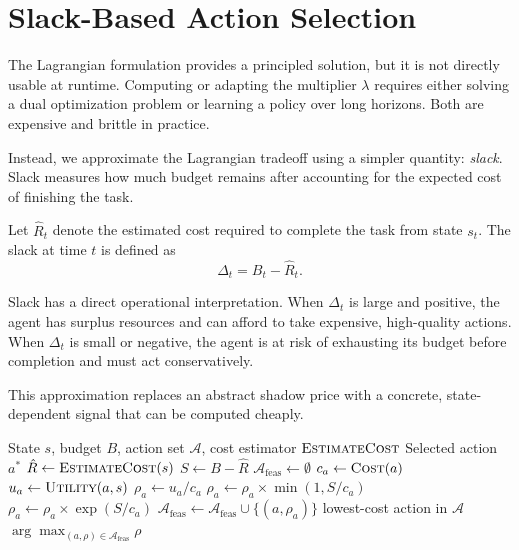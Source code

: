 \section{Slack-Based Action Selection}

The Lagrangian formulation provides a principled solution, but it is not directly usable at runtime. Computing or adapting the multiplier $\lambda$ requires either solving a dual optimization problem or learning a policy over long horizons. Both are expensive and brittle in practice.

Instead, we approximate the Lagrangian tradeoff using a simpler quantity: \emph{slack}. Slack measures how much budget remains after accounting for the expected cost of finishing the task.

Let $\hat{R}_t$ denote the estimated cost required to complete the task from state $s_t$. The slack at time $t$ is defined as
\[
\Delta_t = B_t - \hat{R}_t.
\]

Slack has a direct operational interpretation. When $\Delta_t$ is large and positive, the agent has surplus resources and can afford to take expensive, high-quality actions. When $\Delta_t$ is small or negative, the agent is at risk of exhausting its budget before completion and must act conservatively.

This approximation replaces an abstract shadow price with a concrete, state-dependent signal that can be computed cheaply.

\begin{algorithm}
\caption{Slack-Adjusted Action Selection}
\begin{algorithmic}[1]
\Require State $s$, budget $B$, action set $\mathcal{A}$, cost estimator $\textsc{EstimateCost}$
\Ensure Selected action $a^*$
\State $\hat{R} \gets \textsc{EstimateCost}(s)$
\State $S \gets B - \hat{R}$
\State $\mathcal{A}_{\text{feas}} \gets \emptyset$
    \State $c_a \gets \textsc{Cost}(a)$
    \State $u_a \gets \textsc{Utility}(a, s)$
        \State $\rho_a \gets u_a / c_a$ 
            \State $\rho_a \gets \rho_a \times \min(1, S / c_a)$
        \Else
            \State $\rho_a \gets \rho_a \times \exp(S / c_a)$
        \EndIf
        \State $\mathcal{A}_{\text{feas}} \gets \mathcal{A}_{\text{feas}} \cup \{(a, \rho_a)\}$
    \EndIf
\EndFor
{}
    \State \Return lowest-cost action in $\mathcal{A}$
\EndIf
\State \Return $\arg\max_{(a, \rho) \in \mathcal{A}_{\text{feas}}} \rho$
\end{algorithmic}
\end{algorithm}

